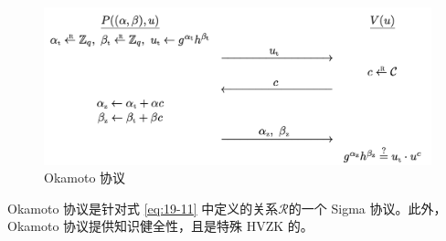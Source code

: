 \begin{figure}
  \centering
  \includegraphics[width=0.75\linewidth]{figures/chapter19/fig6.png}
  \caption{Okamoto 协议}
  \label{fig:19-6}
\end{figure}

\begin{theorem}
Okamoto 协议是针对式 \ref{eq:19-11} 中定义的关系$\mathcal{R}$的一个 Sigma 协议。此外，Okamoto 协议提供知识健全性，且是特殊 HVZK 的。
\end{theorem}

